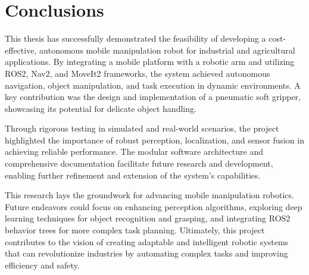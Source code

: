 \section{Conclusions}

This thesis has successfully demonstrated the feasibility of developing a cost-effective, autonomous mobile 
manipulation robot for industrial and agricultural applications. By integrating a mobile platform with a robotic
arm and utilizing ROS2, Nav2, and MoveIt2 frameworks, the system achieved autonomous navigation, object manipulation, 
and task execution in dynamic environments. A key contribution was the design and implementation of a pneumatic 
soft gripper, showcasing its potential for delicate object handling.

Through rigorous testing in simulated and real-world scenarios, the project highlighted the importance of robust 
perception, localization, and sensor fusion in achieving reliable performance. The modular software architecture 
and comprehensive documentation facilitate future research and development, enabling further refinement and 
extension of the system's capabilities.

This research lays the groundwork for advancing mobile manipulation robotics. Future endeavors could focus on 
enhancing perception algorithms, exploring deep learning techniques for object recognition and grasping, and 
integrating ROS2 behavior trees for more complex task planning. Ultimately, this project contributes to the 
vision of creating adaptable and intelligent robotic systems that can revolutionize industries by automating 
complex tasks and improving efficiency and safety.


